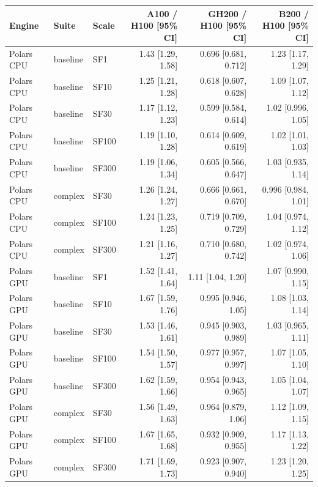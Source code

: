 \begin{longtable}{lllrrr}
\toprule
Engine & Suite & Scale & A100 / H100 [95\% CI] & GH200 / H100 [95\% CI] & B200 / H100 [95\% CI] \\
\midrule
\endhead
\bottomrule
\endfoot
Polars CPU & baseline & SF1 & 1.43 [1.29, 1.58] & 0.696 [0.681, 0.712] & 1.23 [1.17, 1.29] \\
Polars CPU & baseline & SF10 & 1.25 [1.21, 1.28] & 0.618 [0.607, 0.628] & 1.09 [1.07, 1.12] \\
Polars CPU & baseline & SF30 & 1.17 [1.12, 1.23] & 0.599 [0.584, 0.614] & 1.02 [0.996, 1.05] \\
Polars CPU & baseline & SF100 & 1.19 [1.10, 1.28] & 0.614 [0.609, 0.619] & 1.02 [1.01, 1.03] \\
Polars CPU & baseline & SF300 & 1.19 [1.06, 1.34] & 0.605 [0.566, 0.647] & 1.03 [0.935, 1.14] \\
Polars CPU & complex & SF30 & 1.26 [1.24, 1.27] & 0.666 [0.661, 0.670] & 0.996 [0.984, 1.01] \\
Polars CPU & complex & SF100 & 1.24 [1.23, 1.25] & 0.719 [0.709, 0.729] & 1.04 [0.974, 1.12] \\
Polars CPU & complex & SF300 & 1.21 [1.16, 1.27] & 0.710 [0.680, 0.742] & 1.02 [0.974, 1.06] \\
Polars GPU & baseline & SF1 & 1.52 [1.41, 1.64] & 1.11 [1.04, 1.20] & 1.07 [0.990, 1.15] \\
Polars GPU & baseline & SF10 & 1.67 [1.59, 1.76] & 0.995 [0.946, 1.05] & 1.08 [1.03, 1.14] \\
Polars GPU & baseline & SF30 & 1.53 [1.46, 1.61] & 0.945 [0.903, 0.989] & 1.03 [0.965, 1.11] \\
Polars GPU & baseline & SF100 & 1.54 [1.50, 1.57] & 0.977 [0.957, 0.997] & 1.07 [1.05, 1.10] \\
Polars GPU & baseline & SF300 & 1.62 [1.59, 1.66] & 0.954 [0.943, 0.965] & 1.05 [1.04, 1.07] \\
Polars GPU & complex & SF30 & 1.56 [1.49, 1.63] & 0.964 [0.879, 1.06] & 1.12 [1.09, 1.15] \\
Polars GPU & complex & SF100 & 1.67 [1.65, 1.68] & 0.932 [0.909, 0.955] & 1.17 [1.13, 1.22] \\
Polars GPU & complex & SF300 & 1.71 [1.69, 1.73] & 0.923 [0.907, 0.940] & 1.23 [1.20, 1.25] \\

\end{longtable}
